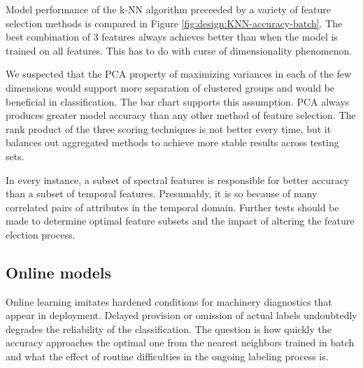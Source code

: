 Model performance of the k-NN algorithm preceeded by a variety of feature selection methods is compared in Figure \ref{fig:design:KNN-accuracy-batch}. The best combination of 3 features always achieves better than when the model is trained on all features. This has to do with curse of dimensionality phenomenon. 


We suspected that the PCA property of maximizing variances in each of the few dimensions would support more separation of clustered groups and would be beneficial in classification. The bar chart supports this assumption. PCA always produces greater model accuracy than any other method of feature selection. The rank product of the three scoring techniques is not better every time, but it balances out aggregated methods to achieve more stable results across testing sets. 

In every instance, a subset of spectral features is responsible for better accuracy than a subset of temporal features. Presumably, it is so because of many correlated pairs of attributes in the temporal domain. Further tests should be made to determine optimal feature subsets and the impact of altering the feature election process.

\clearpage
\subsection{Online models}
Online learning imitates hardened conditions for machinery diagnostics that appear in deployment. Delayed provision or omission of actual labels undoubtedly degrades the reliability of the classification. The question is how quickly the accuracy approaches the optimal one from the nearest neighbors trained in batch and what the effect of routine difficulties in the ongoing labeling process is.

